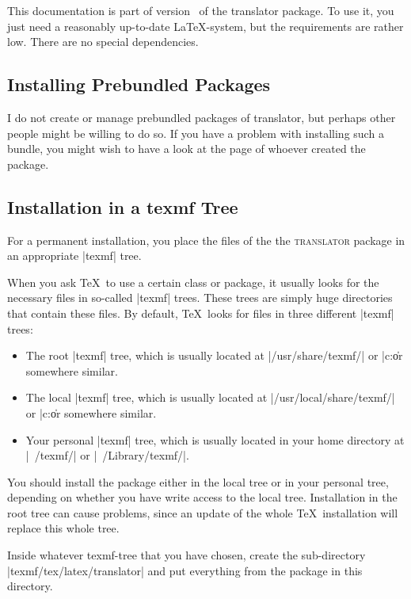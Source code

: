 \documentclass{ltxdoc}
\begin{document}
This documentation is part of version \translatorversion\ of the
translator package. To use it, you just need a reasonably up-to-date
\LaTeX-system, but the requirements are rather low. There are no
special dependencies.


\subsection{Installing Prebundled Packages}

I do not create or manage prebundled packages of translator, but
perhaps other people might be willing to do so. If you have a
problem with installing such a bundle, you might wish to have a look
at the page of whoever created the package.


\subsection{Installation in a texmf Tree}

For a permanent installation, you place the files of the
the \textsc{translator} package in an appropriate |texmf| tree. 

When you ask \TeX\ to use a certain class or package, it usually looks
for the necessary files in so-called |texmf| trees. These trees
are simply huge directories that contain these files. By default,
\TeX\ looks for files in three different |texmf| trees:
\begin{itemize}
\item
  The root |texmf| tree, which is usually located at
  |/usr/share/texmf/| or |c:\texmf\| or somewhere similar.
\item
  The local  |texmf| tree, which is usually located at
  |/usr/local/share/texmf/| or |c:\localtexmf\| or somewhere similar.
\item
  Your personal  |texmf| tree, which is usually located in your home
  directory at |~/texmf/| or |~/Library/texmf/|.   
\end{itemize}

You should install the package either in the local tree or in
your personal tree, depending on whether you have write access to the
local tree. Installation in the root tree can cause problems, since an
update of the whole \TeX\ installation will replace this whole tree.

Inside whatever texmf-tree that you have chosen, create the
sub-directory |texmf/tex/latex/translator| and put everything from the
package in this directory.
\end{document}

